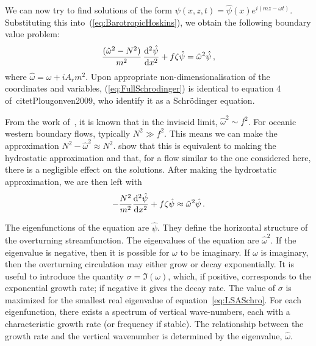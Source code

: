 We can now try to find solutions of the form $\psi(x, z, t) = \hat{\psi}(x)e^{i(mz - \omega t)}$. Substituting this into~(\ref{eq:BarotropicHoskins}), we obtain the following boundary value problem:
\begin{equation}
    \frac{(\hat{\omega}^2 - N^2 )}{m^2}\, \dv[2]{\hat{\psi}}{x} + f \zeta \hat{\psi} = \hat{\omega}^2 \hat{\psi}\, ,
    \label{eq:FullSchrodinger}
\end{equation}
where $\hat{\omega} = \omega + i A_r m^2$. Upon appropriate non-dimensionalisation of the coordinates and variables, (\ref{eq:FullSchrodinger}) is identical to equation 4 of~citet{Plougonven2009}, who identify it as a Schr\"odinger equation.


From the work of~\citet{Hoskins1974}, it is known that in the inviscid limit, $\hat{\omega}^2 \sim f^2$. For oceanic western boundary flows, typically $N^2 \gg f^2$. This means we can make the approximation $N^2 - \hat{\omega}^2 \approx N^2$. \citet{Plougonven2009} show that this is equivalent to making the hydrostatic approximation and that, for a flow similar to the one considered here, there is a negligible effect on the solutions. After making the hydrostatic approximation, we are then left with
\begin{equation}
    -\frac{N^2}{m^2} \dv[2]{\hat{\psi}}{x} + f\zeta\hat{\psi} \approx \hat{\omega}^2 \hat{\psi} \, .
    \label{eq:LSASchro}
\end{equation}

The eigenfunctions of the equation are $\hat{\psi}$. They define the horizontal structure of the overturning streamfunction. The eigenvalues of the equation are $\hat{\omega}^2$. If the eigenvalue is negative, then it is possible for $\omega$ to be imaginary. If $\omega$ is imaginary, then the overturning circulation may either grow or decay exponentially. It is useful to introduce the quantity $\sigma = \Im(\omega)$, which, if positive, corresponds to the exponential growth rate; if negative it gives the decay rate. The value of $\sigma$ is maximized for the smallest real eigenvalue of equation~\ref{eq:LSASchro}. For each eigenfunction, there exists a spectrum of vertical wave-numbers, each with a characteristic growth rate (or frequency if stable). The relationship between the growth rate and the vertical wavenumber is determined by the eigenvalue, $\hat{\omega}$.

